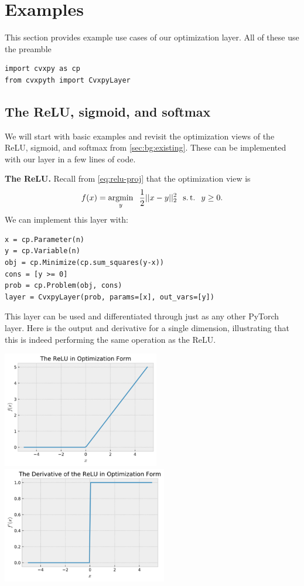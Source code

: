 \newpage
\section{Examples}
\label{sec:cvxpyth:examples}

This section provides example use cases of our \cvxpy
optimization layer. All of these use the preamble

\begin{lstlisting}
import cvxpy as cp
from cvxpyth import CvxpyLayer
\end{lstlisting}

\subsection{The ReLU, sigmoid, and softmax}
We will start with basic examples and revisit the optimization
views of the ReLU, sigmoid, and softmax from \cref{sec:bg:existing}.
These can be implemented with our \cvxpy layer
in a few lines of code.

\textbf{The ReLU.}
Recall from \cref{eq:relu-proj} that the optimization view is
\begin{equation*}
  f(x) = \operatorname*{argmin}_y \;\; \frac{1}{2}||x-y||_2^2 \;\; \operatorname*{s.t.} \;\; y\geq 0.
\end{equation*}
We can implement this layer with:
\begin{lstlisting}
x = cp.Parameter(n)
y = cp.Variable(n)
obj = cp.Minimize(cp.sum_squares(y-x))
cons = [y >= 0]
prob = cp.Problem(obj, cons)
layer = CvxpyLayer(prob, params=[x], out_vars=[y])
\end{lstlisting}

This layer can be used and differentiated through
just as any other PyTorch layer.
Here is the output and derivative for a single
dimension, illustrating that this is indeed performing
the same operation as the ReLU.

\includegraphics[height=2in]{fs/output_2.pdf}
\includegraphics[height=2in]{fs/output_3.pdf}

